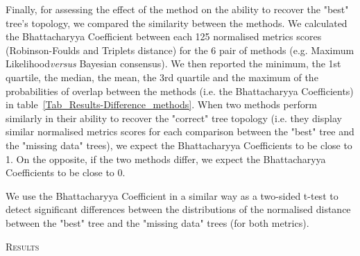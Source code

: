 \documentclass[12pt,letterpaper]{article}
\renewcommand{\section}[1]{%
\bigskip
\begin{center}
\begin{Large}
\normalfont\scshape #1
\medskip
\end{Large}
\end{center}}
\begin{document}
Finally, for assessing the effect of the method on the ability to recover the "best" tree's topology, we compared the similarity between the methods. We calculated the Bhattacharyya Coefficient between each 125 normalised metrics scores (Robinson-Foulds and Triplets distance) for the 6 pair of methods (e.g. Maximum Likelihood\textit{versus} Bayesian consensus). We then reported the minimum, the 1st quartile, the median, the mean, the 3rd quartile and the maximum of the probabilities of overlap between the methods (i.e. the Bhattacharyya Coefficients) in table~\ref{Tab_Results-Difference_methods}. When two methods perform similarly in their ability to recover the "correct" tree topology (i.e. they display similar normalised metrics scores for each comparison between the "best" tree and the "missing data" trees), we expect the Bhattacharyya Coefficients to be close to 1. On the opposite, if the two methods differ, we expect the Bhattacharyya Coefficients to be close to 0.

We use the Bhattacharyya Coefficient in a similar way as a two-sided t-test to detect significant differences between the distributions of the normalised distance between the "best" tree and the "missing data" trees (for both metrics).

%
%

\section{Results}

\end{document}
